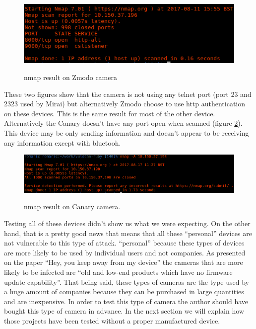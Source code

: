\documentclass{report}
\begin{document}
\begin{figure}[h]
 \caption{nmap result on Zmodo camera}
 \centering
 \includegraphics[width=1.2\textwidth]{./img/exp/resultelse}
 \label{fig:resultelse-zm}
\end{figure}
These two figures show that the camera is not using any telnet port (port 23 and 2323 used by Mirai) but alternatively Zmodo choose to use http authentication on these devices. This is the same result for most of the other device.\newline
Alternatively the Canary doesn't have any port open when scanned (figure \ref{fig:canary}). This device may be only sending information and doesn't appear to be receiving any information except with bluetooh.
\newpage
\begin{figure}[h]
 \caption{nmap result on Canary \protect\footnotemark camera.}
 \centering
 \includegraphics[width=1.2\textwidth]{./img/exp/canary}
 \label{fig:canary}
\end{figure}


Testing all of these devices didn't show us what we were expecting. On the other hand, that is a pretty good news that means that all these ``personal'' devices are not vulnerable to this type of attack. ``personal'' because these types of devices are more likely to be used by individual users and not companies. As presented on the paper ``Hey, you keep away from my device'' \autocite{cao2017hey} the cameras that are more likely to be infected are ``old and low-end products which have no firmware update capability''. That being said, these types of cameras are the type used by a huge amount of companies because they can be purchased in large quantities and are inexpensive. In order to test this type of camera the author should have bought this type of camera in advance.\newline
In the next section we will explain how those projects have been tested without a proper manufactured device.
\end{document}
